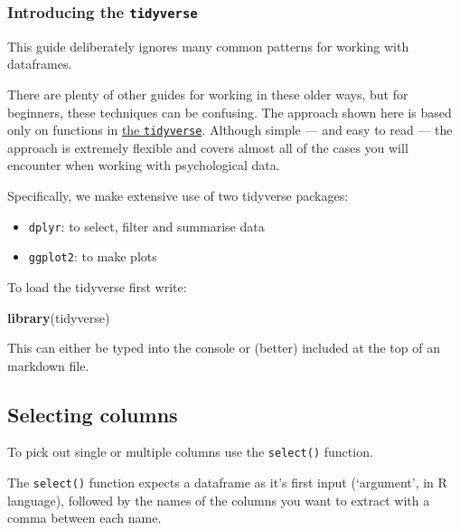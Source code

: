 \documentclass[]{article}
\newenvironment{Shaded}{\begin{snugshade}}{\end{snugshade}}
\newcommand{\KeywordTok}[1]{\textcolor[rgb]{0.13,0.29,0.53}{\textbf{#1}}}
\newcommand{\NormalTok}[1]{#1}
\providecommand{\tightlist}{%
  \setlength{\itemsep}{0pt}\setlength{\parskip}{0pt}}
\begin{document}
\hypertarget{tidyverse}{%
\subsubsection*{\texorpdfstring{Introducing the \texttt{tidyverse}}{Introducing the tidyverse}}\label{tidyverse}}

This guide deliberately ignores many common patterns for working with
dataframes.

There are plenty of other guides for working in these older ways, but for
beginners, these techniques can be confusing. The approach shown here is based
only on functions in \protect\hyperlink{tidyverse}{the \texttt{tidyverse}}. Although simple --- and easy
to read --- the approach is extremely flexible and covers almost all of the
cases you will encounter when working with psychological data.

Specifically, we make extensive use of two tidyverse packages:

\begin{itemize}
\tightlist
\item
  \texttt{dplyr}: to select, filter and summarise data
\item
  \texttt{ggplot2}: to make plots
\end{itemize}

To load the tidyverse first write:

\begin{Shaded}
\begin{Highlighting}[]
\KeywordTok{library}\NormalTok{(tidyverse)}
\end{Highlighting}
\end{Shaded}

This can either be typed into the console or (better) included at the top of an
markdown file.

\hypertarget{selecting-columns}{%
\subsection*{Selecting columns}\label{selecting-columns}}

To pick out single or multiple columns use the \texttt{select()} function.

The \texttt{select()} function expects a dataframe as it's first input (`argument', in
R language), followed by the names of the columns you want to extract with a
comma between each name.
\end{document}
